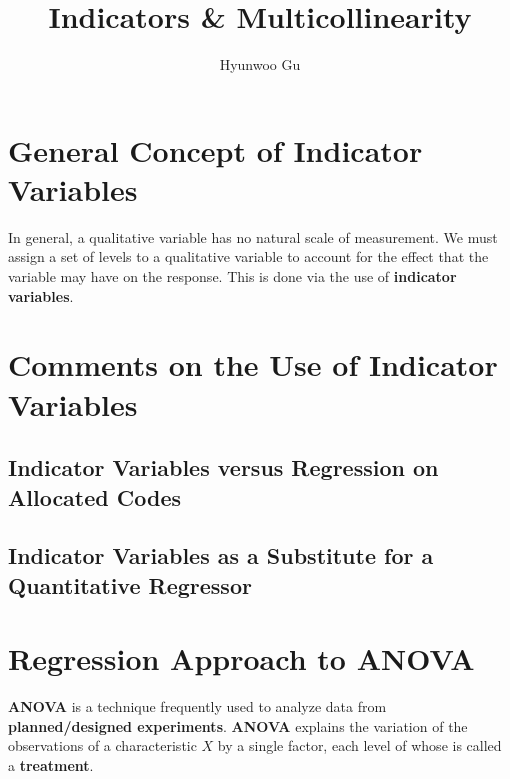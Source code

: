 \documentclass[12pt]{article}
\begin{document}
\title{\textbf{Indicators \& Multicollinearity}}
\author{Hyunwoo Gu}
\date{}

\maketitle

\section{General Concept of Indicator Variables}

In general, a qualitative variable has no natural scale of measurement. We must assign a set of levels to a qualitative variable to account for the effect that the variable may have on the response. This is done via the use of \textbf{indicator variables}.


\section{Comments on the Use of Indicator Variables}

\subsection{Indicator Variables versus Regression on Allocated Codes}


\subsection{Indicator Variables as a Substitute for a Quantitative Regressor}


\section{Regression Approach to ANOVA}

\textbf{ANOVA} is a technique frequently used to analyze data from \textbf{planned/designed experiments}. \textbf{ANOVA} explains the variation of the observations of a characteristic $X$ by a single factor, each level of whose is called a \textbf{treatment}. 
\end{document}
